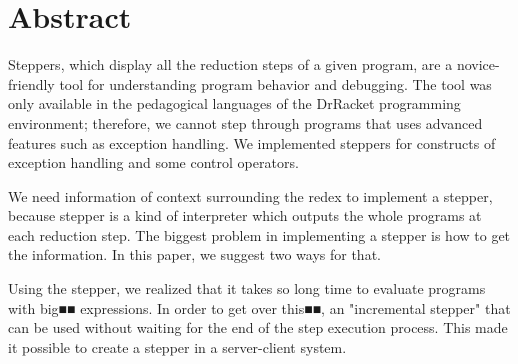 \chapter*{Abstract}

Steppers, which display all the reduction steps of a given program,
are a novice-friendly tool for understanding program behavior and debugging.
The tool was only available in
the pedagogical languages of the DrRacket programming environment;
therefore, we cannot step through programs that uses advanced features
such as exception handling.
We implemented steppers for constructs of exception handling and
some control operators.

We need information of context surrounding the redex
to implement a stepper,
because stepper is a kind of interpreter which outputs
the whole programs at each reduction step.
The biggest problem in implementing a stepper
is how to get the information.
In this paper, we suggest two ways for that.

Using the stepper,
we realized that it takes so long time to evaluate programs with big■■ expressions.
In order to get over this■■,
an "incremental stepper" that can be used
without waiting for the end of the step execution process.
This made it possible to create a stepper in a server-client system.

